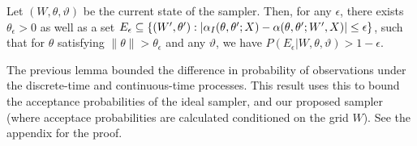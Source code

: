 \begin{proposition}
  Let $(W, \theta, \vartheta)$ be the current state of the sampler.
Then, for any $\epsilon$, there exists $\theta_\epsilon > 0$ as well as a set $E_\epsilon \subseteq \{(W', \theta'): |\alpha_I(\theta,\theta';X) - \alpha(\theta,\theta';W',X)| \le \epsilon\}$, such that for $\theta$ satisfying $\| \theta \| > \theta_\epsilon$ and any $\vartheta$, we have
$P(E_\epsilon|W,\theta,\vartheta) > 1-\epsilon$.
\label{prop:mix0}
\end{proposition}
The previous lemma bounded the difference in probability of observations 
under the discrete-time and continuous-time processes. This result 
uses this to bound the acceptance probabilities of the ideal sampler, 
and our proposed sampler (where acceptace probabilities are calculated 
conditioned on the grid $W$). See the appendix for the proof.


